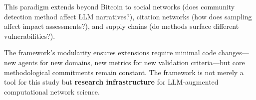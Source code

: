 This paradigm extends beyond Bitcoin to social networks (does community detection method affect LLM narratives?), citation networks (how does sampling affect impact assessments?), and supply chains (do methods surface different vulnerabilities?).

The framework's modularity ensures extensions require minimal code changes---new agents for new domains, new metrics for new validation criteria---but core methodological commitments remain constant. The framework is not merely a tool for this study but \textbf{research infrastructure} for LLM-augmented computational network science.










